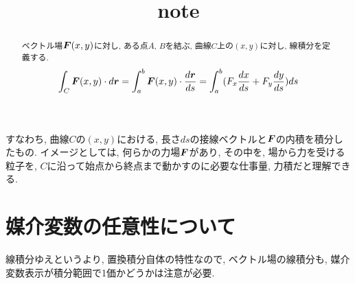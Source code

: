 \documentclass{jsarticle} \usepackage[dvipdfmx]{graphicx} \usepackage[dvipdfmx]{hyperref}
\title{note}
\newcommand*{\mbold}[1]{\mbox{\boldmath $#1$}}
\begin{document}
\maketitle

\begin{abstract}
  ベクトル場$\mbold{F}(x, y)$に対し, ある点$A$, $B$を結ぶ, 曲線$C$上の$(x, y)$に対し, 線積分を定義する. 
  \begin{equation}
    \int_C \mbold{F}(x, y)\cdot d\mbold{r}
    = \int_a^b \mbold{F}(x, y) \cdot \frac{d\mbold{r}}{ds}
    = \int_a^b (F_x \frac{dx}{ds} + F_y \frac{dy}{ds})ds
  \end{equation}
\end{abstract}
すなわち, 曲線$C$の$(x, y)$における, 長さ$ds$の接線ベクトルと$\mbold{F}$の内積を積分したもの. イメージとしては, 何らかの力場$\mbold{F}$があり, その中を, 場から力を受ける粒子を, $C$に沿って始点から終点まで動かすのに必要な仕事量, 力積だと理解できる. 
\section*{媒介変数の任意性について}
線積分ゆえというより, 置換積分自体の特性なので, ベクトル場の線積分も, 媒介変数表示が積分範囲で1価かどうかは注意が必要. 
\end{document}
